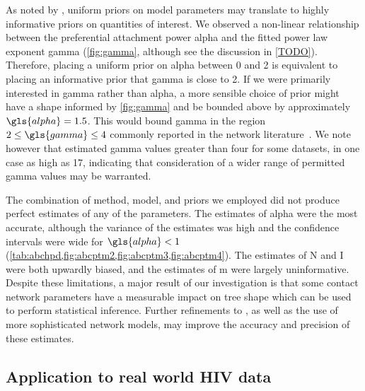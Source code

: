 As noted by \textcite{lintusaari2016identifiability}, uniform priors on model
parameters may translate to highly informative priors on quantities of
interest. We observed a non-linear relationship between the preferential
attachment power \gls{alpha} and the fitted power law exponent \gls{gamma}
(\cref{fig:gamma}, although see the discussion in \cref{TODO}). Therefore,
placing a uniform prior on \gls{alpha} between 0 and 2 is equivalent to placing an
informative prior that \gls{gamma} is close to 2. If we were primarily
interested in \gls{gamma} rather than \gls{alpha}, a more sensible choice of
prior might have a shape informed by \cref{fig:gamma} and be bounded above by
approximately $\gls{alpha} = 1.5$. This would bound \gls{gamma} in the region
$2 \leq \gls{gamma} \leq 4$ commonly reported in the network
literature~\autocite{liljeros2001web, schneeberger2004scale, colgate1989risk,
brown2011transmission}. We note however that \textcite{jones2003assessment}
estimated \gls{gamma} values greater than four for some datasets, in one case
as high as 17, indicating that consideration of a wider range of permitted
\gls{gamma} values may be warranted.

The combination of method, model, and priors we employed did not produce
perfect estimates of any of the parameters. The estimates of \gls{alpha} were
the most accurate, although the variance of the estimates was high and the
confidence intervals were wide for $\gls{alpha} < 1$
(\cref{tab:abchpd,fig:abcptm2,fig:abcptm3,fig:abcptm4}). The estimates of
\gls{N} and \gls{I} were both upwardly biased, and the estimates of \gls{m}
were largely uninformative. Despite these limitations, a major result of our
investigation is that some contact network parameters have a measurable impact
on tree shape which can be used to perform statistical inference. Further
refinements to , as well as the use of more sophisticated
network models, may improve the accuracy and precision of these estimates.

\subsection{Application to real world HIV data}


